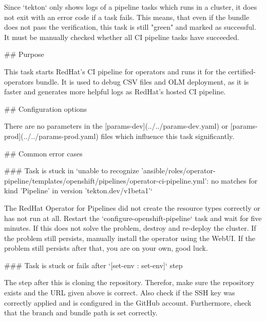 Since `tekton` only shows logs of a pipeline tasks which runs in a cluster, it does not exit with an error code if a task fails.
This means, that even if the bundle does not pass the verification, this task is still "green" and marked as successful.
It must be manually checked whether all CI pipeline tasks have succeeded.

## Purpose

This task starts RedHat's CI pipeline for operators and runs it for the certified-operators bundle.
It is used to debug CSV files and OLM deployment, as it is faster and generates more helpful logs as RedHat's hosted CI pipeline.

## Configuration options

There are no parameters in the [params-dev](../../params-dev.yaml) or [params-prod](../../params-prod.yaml) files which influence this task significantly.

## Common error cases

### Task is stuck in `unable to recognize 'ansible/roles/operator-pipeline/templates/openshift/pipelines/operator-ci-pipeline.yml': no matches for kind 'Pipeline' in version 'tekton.dev/v1beta1'`

The RedHat Operator for Pipelines did not create the resource types correctly or has not run at all.
Restart the `configure-openshift-pipeline` task and wait for five minutes.
If this does not solve the problem, destroy and re-deploy the cluster.
If the problem still persists, manually install the operator using the WebUI.
If the problem still persists after that, you are on your own, good luck.

### Task is stuck or fails after `[set-env : set-env]` step

The step after this is cloning the repository.
Therefor, make sure the repository exists and the URL given above is correct.
Also check if the SSH key was correctly applied and is configured in the GitHub account.
Furthermore, check that the branch and bundle path is set correctly.

